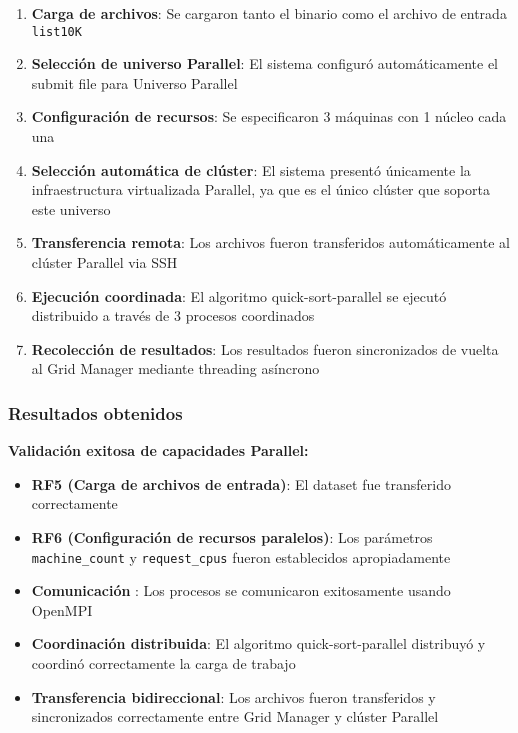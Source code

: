 \begin{enumerate}
	\item \textbf{Carga de archivos}: Se cargaron tanto el binario \MPI como el archivo de entrada \texttt{list10K}
	
	\item \textbf{Selección de universo Parallel}: El sistema configuró automáticamente el submit file para Universo Parallel
	
	\item \textbf{Configuración de recursos}: Se especificaron 3 máquinas con 1 núcleo cada una
	
	\item \textbf{Selección automática de clúster}: El sistema presentó únicamente la infraestructura virtualizada Parallel, ya que es el único clúster que soporta este universo
	
	\item \textbf{Transferencia remota}: Los archivos fueron transferidos automáticamente al clúster Parallel via SSH
	
	\item \textbf{Ejecución coordinada}: El algoritmo quick-sort-parallel se ejecutó distribuido a través de 3 procesos \MPI coordinados
	
	\item \textbf{Recolección de resultados}: Los resultados fueron sincronizados de vuelta al Grid Manager mediante threading asíncrono
\end{enumerate}

\subsubsection{Resultados obtenidos}
\noindent

\textbf{Validación exitosa de capacidades Parallel:}

\begin{itemize}
	\item \textbf{RF5 (Carga de archivos de entrada)}: El dataset fue transferido correctamente
	\item \textbf{RF6 (Configuración de recursos paralelos)}: Los parámetros \texttt{machine\_count} y \texttt{request\_cpus} fueron establecidos apropiadamente
	\item \textbf{Comunicación \MPI}: Los procesos se comunicaron exitosamente usando OpenMPI
	\item \textbf{Coordinación distribuida}: El algoritmo quick-sort-parallel distribuyó y coordinó correctamente la carga de trabajo
	\item \textbf{Transferencia bidireccional}: Los archivos fueron transferidos y sincronizados correctamente entre Grid Manager y clúster Parallel
\end{itemize}


